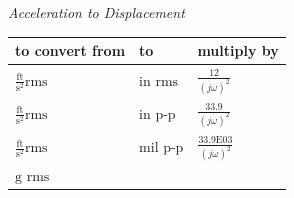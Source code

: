 \documentclass[
]{book}
\begin{document}
\emph{Acceleration to Displacement}

\begin{longtable}[]{@{}lll@{}}
\toprule
\begin{minipage}[b]{0.44\columnwidth}\raggedright
to convert from\strut
\end{minipage} & \begin{minipage}[b]{0.11\columnwidth}\raggedright
to\strut
\end{minipage} & \begin{minipage}[b]{0.36\columnwidth}\raggedright
multiply by\strut
\end{minipage}\tabularnewline
\midrule
\endhead
\begin{minipage}[t]{0.44\columnwidth}\raggedright
\(\frac{\text{ft}}{\text{s}^2} \text{rms}\)\strut
\end{minipage} & \begin{minipage}[t]{0.11\columnwidth}\raggedright
\(\text{in rms}\)\strut
\end{minipage} & \begin{minipage}[t]{0.36\columnwidth}\raggedright
\(\frac{12}{ \left( j\omega \right)^2}\)\strut
\end{minipage}\tabularnewline
\begin{minipage}[t]{0.44\columnwidth}\raggedright
\(\frac{\text{ft}}{\text{s}^2} \text{rms}\)\strut
\end{minipage} & \begin{minipage}[t]{0.11\columnwidth}\raggedright
\(\text{in p-p}\)\strut
\end{minipage} & \begin{minipage}[t]{0.36\columnwidth}\raggedright
\(\frac{33.9}{ \left( j\omega \right)^2}\)\strut
\end{minipage}\tabularnewline
\begin{minipage}[t]{0.44\columnwidth}\raggedright
\(\frac{\text{ft}}{\text{s}^2} \text{rms}\)\strut
\end{minipage} & \begin{minipage}[t]{0.11\columnwidth}\raggedright
\(\text{mil p-p}\)\strut
\end{minipage} & \begin{minipage}[t]{0.36\columnwidth}\raggedright
\(\frac{33.9\mathrm{E}03}{ \left( j\omega \right)^2}\)\strut
\end{minipage}\tabularnewline
\begin{minipage}[t]{0.44\columnwidth}\raggedright
\(\text{g rms}\)\strut
\end{minipage} & \begin{minipage}[t]{0.11\columnwidth}\raggedright

\end{minipage}
\end{longtable}
\end{document}
